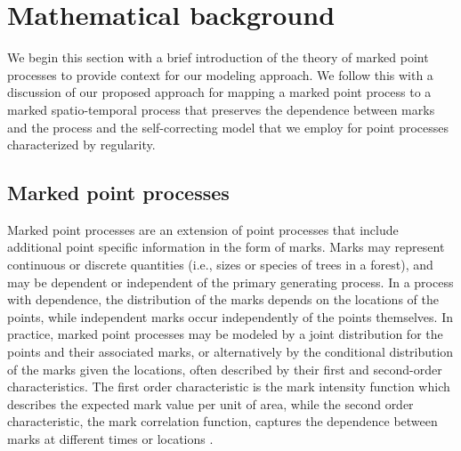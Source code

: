 \section{Mathematical background}\label{sec:background}

We begin this section with a brief introduction of the theory of marked
point processes to provide context for our modeling approach. We follow
this with a discussion of our proposed approach for mapping a marked
point process to a marked spatio-temporal process that preserves the
dependence between marks and the process and the self-correcting model
that we employ for point processes characterized by regularity.

\subsection{Marked point processes}\label{mpp}

Marked point processes are an extension of point processes that include
additional point specific information in the form of marks. Marks may
represent continuous or discrete quantities (i.e., sizes or species of
trees in a forest), and may be dependent or independent of the primary
generating process. In a process with dependence, the distribution of
the marks depends on the locations of the points, while independent
marks occur independently of the points themselves. In practice, marked
point processes may be modeled by a joint distribution for the points
and their associated marks, or alternatively by the conditional
distribution of the marks given the locations, often described by their
first and second-order characteristics. The first order characteristic
is the mark intensity function which describes the expected mark value
per unit of area, while the second order characteristic, the mark
correlation function, captures the dependence between marks at different
times or locations \citep{schlatherDetectingDependenceMarks2004}.

